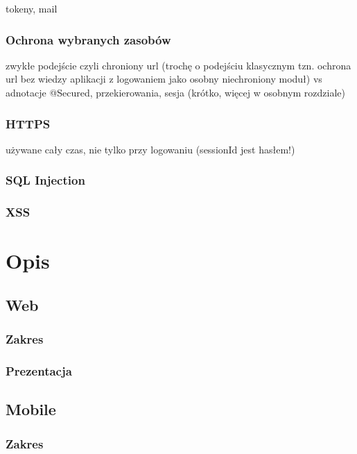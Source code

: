 \documentclass[11pt]{aghdpl}
\begin{document}
tokeny, mail

\subsection{Ochrona wybranych zasobów}
\label{sec:ochronaWybranychZasobow}

zwykłe podejście czyli chroniony url (trochę o podejściu klasycznym tzn. ochrona url bez wiedzy aplikacji z logowaniem jako osobny niechroniony moduł) vs adnotacje
@Secured, przekierowania, sesja (krótko, więcej w osobnym rozdziale)

\subsection{HTTPS}

używane cały czas, nie tylko przy logowaniu (sessionId jest hasłem!)

\subsection{SQL Injection}

\subsection{XSS}



\chapter{Opis}
\label{cha:opis}

\section{Web}
\subsection{Zakres}
\subsection{Prezentacja}
\section{Mobile}
\subsection{Zakres}
\end{document}
